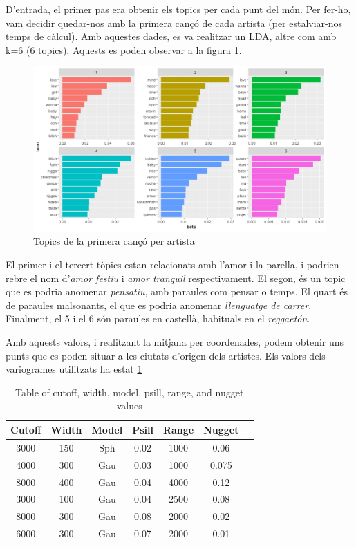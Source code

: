 D'entrada, el primer pas era obtenir els topics per cada punt del món. Per fer-ho, vam decidir quedar-nos amb la primera cançó de cada artista (per estalviar-nos temps de càlcul). Amb aquestes dades, es va realitzar un LDA, altre com amb k=6 (6 topics). Aquests es poden observar a la figura \ref{fig:textual_geotextual_topics}.

\begin{figure}
    \centering
    \includegraphics[width=0.75\linewidth]{Images//8_Textual//Geotextual/lda_topics_geotext.png}
    \caption{Topics de la primera cançó per artista}
    \label{fig:textual_geotextual_topics}
\end{figure}

El primer i el tercert tòpics estan relacionats amb l'amor i la parella, i podrien rebre el nom d'\textit{amor festiu} i \textit{amor tranquil} respectivament. El segon, és un topic que es podria anomenar \textit{pensatiu}, amb paraules com pensar o temps. El quart és de paraules malsonants, el que es podria anomenar \textit{llenguatge de carrer}. Finalment, el 5 i el 6 són paraules en castellà, habituals en el \textit{reggaetón}.

Amb aquests valors, i realitzant la mitjana per coordenades, podem obtenir uns punts que es poden situar a les ciutats d'origen dels artistes. Els valors dels variogrames utilitzats ha estat \ref{tab:textual_variograms}

\begin{table}[H]
    \centering
    \begin{tabular}{ccccccc}
        \toprule
        Cutoff & Width & Model & Psill & Range & Nugget \\
        \midrule
        3000 & 150 & Sph & 0.02 & 1000 & 0.06 \\
        4000 & 300 & Gau & 0.03 & 1000 & 0.075 \\
        8000 & 400 & Gau & 0.04 & 4000 & 0.12 \\
        3000 & 100 & Gau & 0.04 & 2500 & 0.08 \\
        8000 & 300 & Gau & 0.08 & 2000 & 0.02 \\
        6000 & 300 & Gau & 0.07 & 2000 & 0.01 \\
        \bottomrule
    \end{tabular}
    \caption{Table of cutoff, width, model, psill, range, and nugget values}
    \label{tab:textual_variograms}
\end{table}

